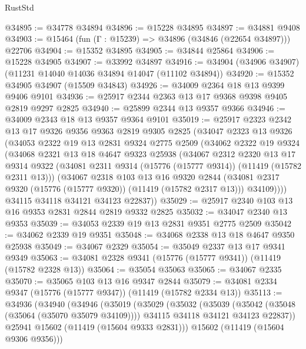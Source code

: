 \begin{lexlean}{RustStd}
\begin{coremodule}
@34895 := @34778 @34894
@34896 := @15228 @34895
@34897 := @34881 @9408
@34903 := @15464 (fun (Γ : @15239) => @34896 (@34846 (@22654 @34897))) @22706
@34904 := @15352 @34895
@34905 := @34844 @25864
@34906 := @15228 @34905
@34907 := @33992 @34897
@34916 := @34904 (@34906 @34907) (@11231 @14040 @14036 @34894 @14047 (@11102 @34894))
@34920 := @15352 @34905 @34907 (@15509 @34843)
@34926 := @34009 @2364 @18 @13 @9399 @9406 @9101
@34936 := @25917 @2344 @2363 @13 @17 @9368 @9398 @9405 @2819 @9297 @2825
@34940 := @25899 @2344 @13 @9357 @9366
@34946 := @34009 @2343 @18 @13 @9357 @9364 @9101
@35019 := @25917
    @2323
    @2342
    @13
    @17
    @9326
    @9356
    @9363
    @2819
    @9305
    @2825
    (@34047
      @2323
      @13
      @9326
      (@34053
        @2322
        @19
        @13
        @2831
        @9324
        @2775
        @2509
        (@34062
          @2322
          @19
          @9324
          (@34068
            @2321
            @13
            @18
            @4647
            @9323
            @25938
            (@34067
              @2312
              @2320
              @13
              @17
              @9314
              @9322
              (@34081 @2311 @9314 (@15776 (@15777 @9314)) (@11419 (@15782 @2311 @13)))
              (@34067
                @2318
                @103
                @13
                @16
                @9320
                @2844
                (@34081 @2317 @9320 (@15776 (@15777 @9320)) (@11419 (@15782 @2317 @13)))
                @34109))))
        @34115
        @34118
        @34121
        @34123
        @22837))
@35029 := @25917 @2340 @103 @13 @16 @9353 @2831 @2844 @2819 @9332 @2825
@35032 := @34047 @2340 @13 @9353
@35039 := @34053 @2339 @19 @13 @2831 @9351 @2775 @2509
@35042 := @34062 @2339 @19 @9351
@35048 := @34068 @2338 @13 @18 @4647 @9350 @25938
@35049 := @34067 @2329
@35054 := @35049 @2337 @13 @17 @9341 @9349
@35063 := @34081 @2328 @9341 (@15776 (@15777 @9341)) (@11419 (@15782 @2328 @13))
@35064 := @35054 @35063
@35065 := @34067 @2335
@35070 := @35065 @103 @13 @16 @9347 @2844
@35079 := @34081 @2334 @9347 (@15776 (@15777 @9347)) (@11419 (@15782 @2334 @13))
@35113 := @34936
    (@34940
      (@34946
        (@35019
          (@35029
            (@35032
              (@35039
                (@35042 (@35048 (@35064 (@35070 @35079 @34109))))
                @34115
                @34118
                @34121
                @34123
                @22837))
            @25941
            @15602
            (@11419 (@15604 @9333 @2831)))
          @15602
          (@11419 (@15604 @9306 @9356)))

\end{coremodule}
\end{lexlean}
